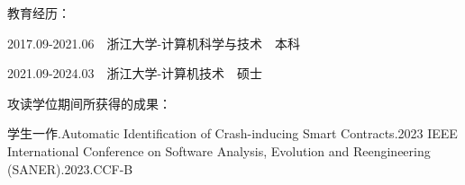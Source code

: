 \cleardoublepage
{}


\noindent 教育经历： 

2017.09-2021.06\ \ 浙江大学-计算机科学与技术\ \ 本科 

2021.09-2024.03\ \ 浙江大学-计算机技术\ \ 硕士 
 
\hspace*{\fill}
\hspace*{\fill}
 
\noindent 攻读学位期间所获得的成果：

学生一作.Automatic Identification of Crash-inducing Smart Contracts.2023 IEEE International Conference on Software Analysis, Evolution and Reengineering (SANER).2023.CCF-B

